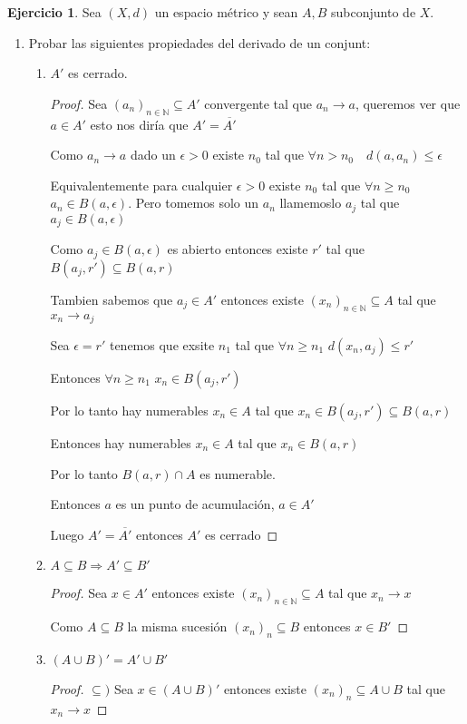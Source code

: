\documentclass[12pt]{report}
\newcommand{\N}{\mathbb{N}}
\newcommand{\ra}{\rightarrow}
\newcommand{\ol}{\overline}
\theoremstyle{definition}
\newtheorem{ej}{Ejercicio}
\begin{document}
\begin{ej}
  Sea $(X,d)$ un espacio métrico y sean $A,B$ subconjunto de $X$.
  \begin{enumerate}
    \item Probar las siguientes propiedades del derivado de un conjunt:
      \begin{enumerate}
	\item $A'$ es cerrado.
	  \begin{proof}
	    Sea $(a_{n})_{n \in \N} \subseteq A'$ convergente tal que $a_{n} \ra a$, queremos ver que $a \in A'$ esto nos diría que $A' = \ol{A'}$

	    Como $a_{n} \ra a$ dado un $\epsilon > 0$ existe $n_{0}$ tal que $\forall n > n_{0} \quad d(a,a_{n}) \leq \epsilon$

	    Equivalentemente para cualquier $\epsilon > 0$ existe $n_{0}$ tal que $\forall n \geq n_{0}$ $a_{n} \in B(a,\epsilon)$. Pero tomemos solo un $a_{n}$ llamemoslo $a_{j}$ tal que $a_{j} \in B(a,\epsilon)$

	    Como $a_{j} \in B(a,\epsilon)$ es abierto entonces existe $r'$ tal que $B(a_{j},r') \subseteq B(a,r)$

	    Tambien sabemos que $a_{j} \in A'$ entonces existe $(x_{n})_{n \in \N} \subseteq A$ tal que $x_{n} \ra a_{j}$

	    Sea $\epsilon = r'$ tenemos que exsite  $n_{1}$ tal que $\forall n \geq n_{1}$ $d(x_{n}, a_{j}) \leq r'$

	    Entonces $\forall n \geq n_{1}$ $x_{n} \in B(a_{j},r')$

	    Por lo tanto hay numerables $x_{n} \in A$ tal que $x_{n}  \in B(a_{j},r') \subseteq B(a,r)$

	    Entonces hay numerables $x_{n} \in A$ tal que $x_{n} \in B(a,r)$

	    Por lo tanto $B(a,r) \cap A$ es numerable.

	    Entonces $a$ es un punto de acumulación, $a \in A'$

	    Luego $A' = \ol{A'}$ entonces $A'$ es cerrado
	  \end{proof}
	\item $A \subseteq B \Longrightarrow A' \subseteq B'$
	  \begin{proof}
	    Sea $x \in A'$ entonces existe $(x_{n} )_{n \in \N} \subseteq A$ tal que $x_{n} \ra x$

	    Como $A \subseteq B$ la misma sucesión $(x_{n})_{n} \subseteq B$ entonces $x \in B'$
	  \end{proof}
	\item $(A \cup B)' = A' \cup B'$
	  \begin{proof}
	  $\subseteq )$ Sea $x \in (A \cup B)'$ entonces existe $(x_{n})_{n} \subseteq A \cup B$ tal que $x_{n} \ra x$


\end{proof}
\end{enumerate}
\end{enumerate}
\end{ej}
\end{document}

